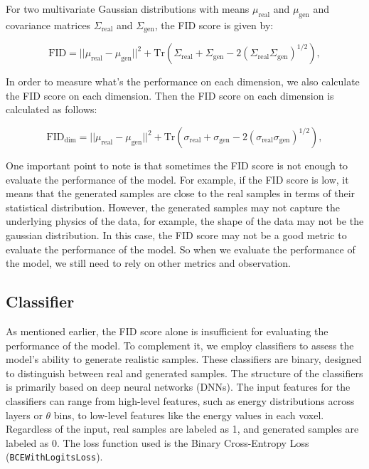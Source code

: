 For two multivariate Gaussian distributions with means $\mu_{\text{real}}$ and $\mu_{\text{gen}}$ and covariance matrices $\Sigma_{\text{real}}$ and $\Sigma_{\text{gen}}$, the FID score is given by:

\begin{equation}
    \text{FID} = ||\mu_{\text{real}} - \mu_{\text{gen}}||^2 + \text{Tr}(\Sigma_{\text{real}} + \Sigma_{\text{gen}} - 2(\Sigma_{\text{real}}\Sigma_{\text{gen}})^{1/2}),
\end{equation}

In order to measure what's the performance on each dimension, we also calculate the FID score on each dimension. Then the FID score on each dimension is calculated as follows:

\begin{equation}
    \text{FID}_{\text{dim}} = ||\mu_{\text{real}} - \mu_{\text{gen}}||^2 + \text{Tr}(\sigma_{\text{real}} + \sigma_{\text{gen}} - 2(\sigma_{\text{real}}\sigma_{\text{gen}})^{1/2}),
\end{equation}

One important point to note is that sometimes the FID score is not enough to evaluate the performance of the model. For example, if the FID score is low, it means that the generated samples are close to the real samples in terms of their statistical distribution. However, the generated samples may not capture the underlying physics of the data, for example, the shape of the data may not be the gaussian distribution. In this case, the FID score may not be a good metric to evaluate the performance of the model. So when we evaluate the performance of the model, we still need to rely on other metrics and observation.

\subsection{Classifier}

As mentioned earlier, the FID score alone is insufficient for evaluating the performance of the model. To complement it, we employ classifiers to assess the model's ability to generate realistic samples. These classifiers are binary, designed to distinguish between real and generated samples. The structure of the classifiers is primarily based on deep neural networks (DNNs). The input features for the classifiers can range from high-level features, such as energy distributions across layers or $\theta$ bins, to low-level features like the energy values in each voxel. Regardless of the input, real samples are labeled as 1, and generated samples are labeled as 0. The loss function used is the Binary Cross-Entropy Loss (\texttt{BCEWithLogitsLoss}).


